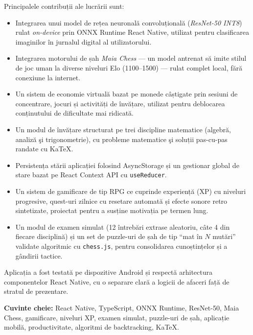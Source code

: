 \documentclass[12pt, a4paper, twoside]{report}
\numberwithin{equation}{section}
\begin{document}
Principalele contribuții ale lucrării sunt:
\begin{itemize}[leftmargin=1.5cm]
  \item Integrarea unui model de rețea neuronală convoluțională (\textit{ResNet-50 INT8}) rulat
    \textit{on-device} prin ONNX Runtime React Native, utilizat pentru clasificarea imaginilor
    în jurnalul digital al utilizatorului.
  \item Integrarea motorului de șah \textit{Maia Chess} — un model antrenat să imite stilul
    de joc uman la diverse niveluri Elo (1100–1500) — rulat complet local, fără conexiune la
    internet.
  \item Un sistem de economie virtuală bazat pe monede câștigate prin sesiuni de concentrare,
    jocuri și activități de învățare, utilizat pentru deblocarea conținutului de dificultate
    mai ridicată.
  \item Un modul de învățare structurat pe trei discipline matematice (algebră, analiză şi
    trigonometrie), cu probleme matematice şi soluții pas-cu-pas
    randate cu KaTeX.
  \item Persistența stării aplicației folosind AsyncStorage și un gestionar global de stare
    bazat pe React Context API cu \texttt{useReducer}.
  \item Un sistem de gamificare de tip RPG ce cuprinde experiență (XP) cu niveluri progresive,
    quest-uri zilnice cu resetare automată și efecte sonore retro sintetizate, proiectat
    pentru a susține motivația pe termen lung.
  \item Un modul de examen simulat (12 întrebări extrase aleatoriu, câte 4 din fiecare
    disciplină) și un set de puzzle-uri de șah de tip ``mat în $N$ mutări'' validate
    algoritmic cu \texttt{chess.js}, pentru consolidarea cunoștințelor și a gândirii tactice.
\end{itemize}

Aplicația a fost testată pe dispozitive Android și respectă arhitectura componentelor React
Native, cu o separare clară a logicii de afaceri față de stratul de prezentare.

\textbf{Cuvinte cheie:} React Native, TypeScript, ONNX Runtime, ResNet-50, Maia Chess,
gamificare, niveluri XP, examen simulat, puzzle-uri de șah, aplicație mobilă, productivitate,
algoritmi de backtracking, KaTeX.

\newpage

\end{document}

